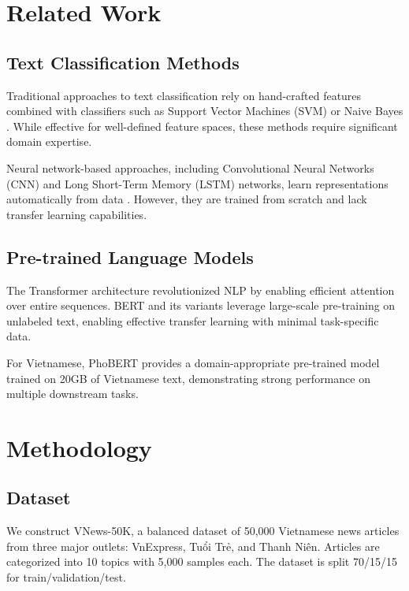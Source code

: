 \documentclass[conference]{IEEEtran}
\begin{document}
\section{Related Work}

\subsection{Text Classification Methods}

Traditional approaches to text classification rely on hand-crafted features
combined with classifiers such as Support Vector Machines (SVM) or Naive
Bayes \cite{Goodfellow2016}. While effective for well-defined feature spaces,
these methods require significant domain expertise.

Neural network-based approaches, including Convolutional Neural Networks
(CNN) and Long Short-Term Memory (LSTM) networks, learn representations
automatically from data \cite{LeCun2015deep}. However, they are trained
from scratch and lack transfer learning capabilities.

\subsection{Pre-trained Language Models}

The Transformer architecture \cite{Vaswani2017attention} revolutionized
NLP by enabling efficient attention over entire sequences. BERT and its
variants leverage large-scale pre-training on unlabeled text, enabling
effective transfer learning with minimal task-specific data.

For Vietnamese, PhoBERT \cite{Le2024bert} provides a domain-appropriate
pre-trained model trained on 20GB of Vietnamese text, demonstrating
strong performance on multiple downstream tasks.

\section{Methodology}

\subsection{Dataset}

We construct VNews-50K, a balanced dataset of 50,000 Vietnamese news
articles from three major outlets: VnExpress, Tuổi Trẻ, and Thanh Niên.
Articles are categorized into 10 topics with 5,000 samples each.
The dataset is split 70/15/15 for train/validation/test.
\end{document}
